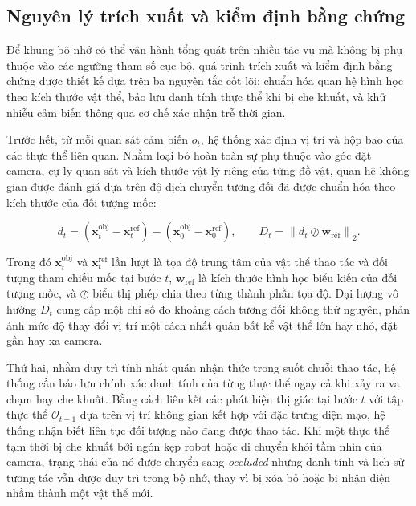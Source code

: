 \subsection{Nguyên lý trích xuất và kiểm định bằng chứng}

Để khung bộ nhớ có thể vận hành tổng quát trên nhiều tác vụ mà không bị phụ thuộc vào các ngưỡng tham số cục bộ, quá trình trích xuất và kiểm định bằng chứng được thiết kế dựa trên ba nguyên tắc cốt lõi: chuẩn hóa quan hệ hình học theo kích thước vật thể, bảo lưu danh tính thực thể khi bị che khuất, và khử nhiễu cảm biến thông qua cơ chế xác nhận trễ thời gian.

Trước hết, từ mỗi quan sát cảm biến $o_t$, hệ thống xác định vị trí và hộp bao của các thực thể liên quan. Nhằm loại bỏ hoàn toàn sự phụ thuộc vào góc đặt camera, cự ly quan sát và kích thước vật lý riêng của từng đồ vật, quan hệ không gian được đánh giá dựa trên độ dịch chuyển tương đối đã được chuẩn hóa theo kích thước của đối tượng mốc:

\begin{equation}
d_t = (\mathbf x_t^{\mathrm{obj}} - \mathbf x_t^{\mathrm{ref}}) - (\mathbf x_0^{\mathrm{obj}} - \mathbf x_0^{\mathrm{ref}}),\qquad
D_t = \left\| d_t \oslash \mathbf w_{\mathrm{ref}} \right\|_2.
\label{eq:scale-invariant-distance}
\end{equation}

Trong đó $\mathbf x_t^{\mathrm{obj}}$ và $\mathbf x_t^{\mathrm{ref}}$ lần lượt là tọa độ trung tâm của vật thể thao tác và đối tượng tham chiếu mốc tại bước $t$, $\mathbf w_{\mathrm{ref}}$ là kích thước hình học biểu kiến của đối tượng mốc, và $\oslash$ biểu thị phép chia theo từng thành phần tọa độ. Đại lượng vô hướng $D_t$ cung cấp một chỉ số đo khoảng cách tương đối không thứ nguyên, phản ánh mức độ thay đổi vị trí một cách nhất quán bất kể vật thể lớn hay nhỏ, đặt gần hay xa camera.

Thứ hai, nhằm duy trì tính nhất quán nhận thức trong suốt chuỗi thao tác, hệ thống cần bảo lưu chính xác danh tính của từng thực thể ngay cả khi xảy ra va chạm hay che khuất. Bằng cách liên kết các phát hiện thị giác tại bước $t$ với tập thực thể $\mathcal O_{t-1}$ dựa trên vị trí không gian kết hợp với đặc trưng diện mạo, hệ thống nhận biết liên tục đối tượng nào đang được thao tác. Khi một thực thể tạm thời bị che khuất bởi ngón kẹp robot hoặc di chuyển khỏi tầm nhìn của camera, trạng thái của nó được chuyển sang \textit{occluded} nhưng danh tính và lịch sử tương tác vẫn được duy trì trong bộ nhớ, thay vì bị xóa bỏ hoặc bị nhận diện nhầm thành một vật thể mới.

